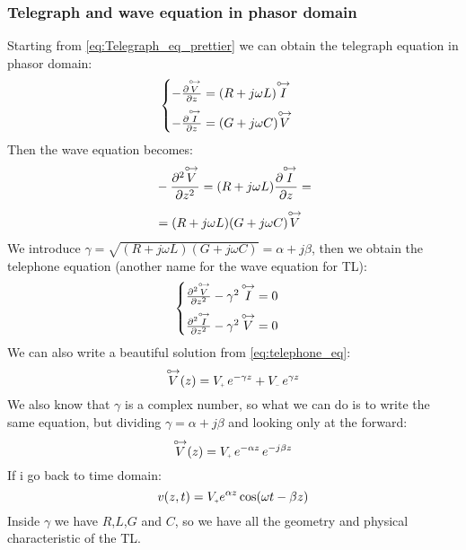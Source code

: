 \subsubsection*{Telegraph and wave equation in phasor domain}
Starting from \cref{eq:Telegraph_eq_prettier} we can obtain the telegraph equation in phasor domain:
\begin{equation}
  \begin{cases}\label{eq:telegraph_in_phas_1}
  -\frac{\partial \overset{\mathbin {{\circ \mkern-2.5mu\rightarrow}}}{V}}{\partial z}=(R+j\omega L)\overset{\mathbin {{\circ \mkern-2.5mu\rightarrow}}}{I}\\[5pt]
  -\frac{\partial \overset{\mathbin {{\circ \mkern-2.5mu\rightarrow}}}{I}}{\partial z}=(G+j\omega C)\overset{\mathbin {{\circ \mkern-2.5mu\rightarrow}}}{V}
  \end{cases}
\end{equation}
Then the wave equation becomes:
\begin{align}
  \begin{split}
    &-\frac{\partial^2 \overset{\mathbin {{\circ \mkern-2.5mu\rightarrow}}}{V}}{\partial z^2}=(R+j\omega L)\frac{\partial \overset{\mathbin {{\circ \mkern-2.5mu\rightarrow}}}{I}}{\partial z}=\\[5pt]
    &=(R+j\omega L)(G+j\omega C)\overset{\mathbin {{\circ \mkern-2.5mu\rightarrow}}}{V}
  \end{split}
\end{align}
We introduce $\gamma = \sqrt{(R+j\omega L)(G+j\omega C)}=\alpha+j\beta$, then we obtain the telephone equation (another name for the wave equation for TL):
\begin{equation}
  \begin{cases}
  \frac{\partial^2 \overset{\mathbin {{\circ \mkern-2.5mu\rightarrow}}}{V}}{\partial z^2}-\gamma^2\,\overset{\mathbin {{\circ \mkern-2.5mu\rightarrow}}}{I}=0\\[5pt]
  \frac{\partial^2 \overset{\mathbin {{\circ \mkern-2.5mu\rightarrow}}}{I}}{\partial z^2}-\gamma^2\,\overset{\mathbin {{\circ \mkern-2.5mu\rightarrow}}}{V}=0
  \end{cases}\label{eq:telephone_eq}
\end{equation}
We can also write a beautiful solution from \cref{eq:telephone_eq}:
\begin{equation}\label{eq:voltage_in_phas_domain}
  \phas{V}(z)=V\bottomPlus \,e^{-\gamma z}+V\bottomMinus \,e^{\gamma z}
\end{equation}
We also know that $\gamma$ is a complex number, so what we can do is to write the same equation, but dividing $\gamma = \alpha+j\beta$ and looking only at the forward:
\begin{equation}
  \phas{V}(z)=V\bottomPlus \,e^{-\alpha z}\,e^{-j\beta z}
\end{equation}
If i go back to time domain:
\begin{equation}
  v(z,t)=V\bottomPlus e^{\alpha z}\cos(\omega t-\beta z)
\end{equation}
Inside $\gamma $ we have $R$,$L$,$G$ and $C$, so we have all the geometry and physical characteristic of the TL.
